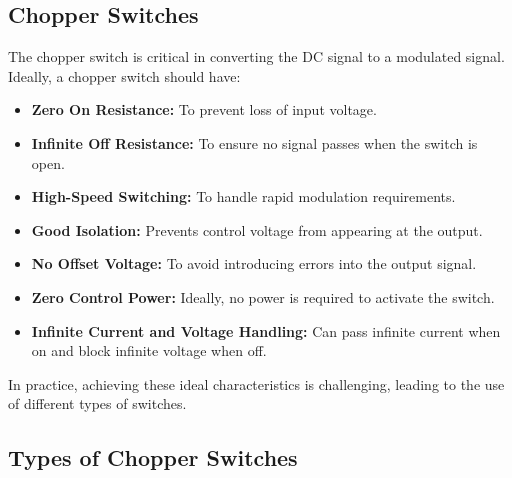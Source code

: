 \subsection{Chopper Switches}
The chopper switch is critical in converting the DC signal to a modulated signal. Ideally, a chopper switch should have:
\begin{itemize}
    \item \textbf{Zero On Resistance:} To prevent loss of input voltage.
    \item \textbf{Infinite Off Resistance:} To ensure no signal passes when the switch is open.
    \item \textbf{High-Speed Switching:} To handle rapid modulation requirements.
    \item \textbf{Good Isolation:} Prevents control voltage from appearing at the output.
    \item \textbf{No Offset Voltage:} To avoid introducing errors into the output signal.
    \item \textbf{Zero Control Power:} Ideally, no power is required to activate the switch.
    \item \textbf{Infinite Current and Voltage Handling:} Can pass infinite current when on and block infinite voltage when off.
\end{itemize}
In practice, achieving these ideal characteristics is challenging, leading to the use of different types of switches.

\subsection{Types of Chopper Switches}
